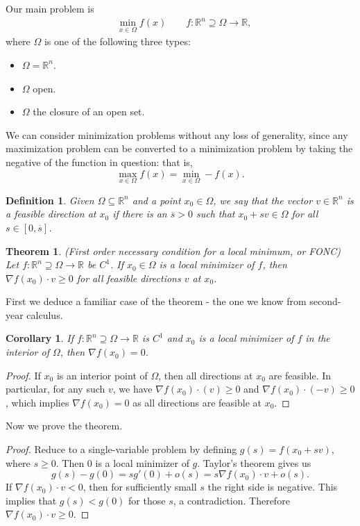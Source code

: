 \documentclass[11pt]{book}
\newcommand{\R}{\mathbb{R}}
\newtheorem{definition}{Definition}[subsection]
\newtheorem{theorem}{Theorem}[subsection]
\newtheorem{corollary}{Corollary}[subsection]
\begin{document}
Our main problem is
\begin{align*}
&\min_{x \in \Omega} f(x) \qquad f : \R^n \supseteq \Omega \to \R,
\end{align*}
where $\Omega$ is one of the following three types:
\begin{itemize}
\item $\Omega = \R^n$.
\item $\Omega$ open.
\item $\Omega$ the closure of an open set.
\end{itemize}
We can consider minimization problems without any loss of generality, since any maximization problem can be converted to a minimization problem by taking the negative of the function in question: that is,
\[
\max_{x \in \Omega} f(x) = \min_{x \in \Omega} -f(x).
\]
\begin{definition}
Given $\Omega \subseteq \R^n$ and a point $x_0 \in \Omega$, we say that the vector $v \in \R^n$ is a feasible direction at $x_0$ if there is an $\overline{s} > 0$ such that $x_0 + sv \in \Omega$ for all $s \in [0, \overline{s}]$.
\end{definition}
\begin{theorem}
(First order necessary condition for a local minimum, or FONC) Let $f : \R^n \supseteq \Omega \to \R$ be $C^1$. If $x_0 \in \Omega$ is a local minimizer of $f$, then $\nabla f(x_0) \cdot v \geq 0$ for all feasible directions $v$ at $x_0$.
\end{theorem}
First we deduce a familiar case of the theorem - the one we know from second-year calculus.
\begin{corollary}
If $f : \R^n \supseteq \Omega \to \R$ is $C^1$ and $x_0$ is a local minimizer of $f$ in the interior of $\Omega$, then $\nabla f(x_0) = 0$.
\end{corollary}
\begin{proof}
If $x_0$ is an interior point of $\Omega$, then all directions at $x_0$ are feasible. In particular, for any such $v$, we have $\nabla f(x_0) \cdot (v) \geq 0$ and $\nabla f(x_0) \cdot (-v) \geq 0$, which implies $\nabla f(x_0) = 0$ as all directions are feasible at $x_0$.
\end{proof}
Now we prove the theorem.
\begin{proof}
Reduce to a single-variable problem by defining $g(s) = f(x_0 + sv)$, where $s \geq 0$. Then $0$ is a local minimizer of $g$. Taylor's theorem gives us
\[
g(s) - g(0) = s g'(0) + o(s) = s \nabla f(x_0) \cdot v + o(s).
\]
If $\nabla f(x_0) \cdot v < 0$, then for sufficiently small $s$ the right side is negative. This implies that $g(s) < g(0)$ for those $s$, a contradiction. Therefore $\nabla f(x_0) \cdot v \geq 0$.
\end{proof}
\end{document}
